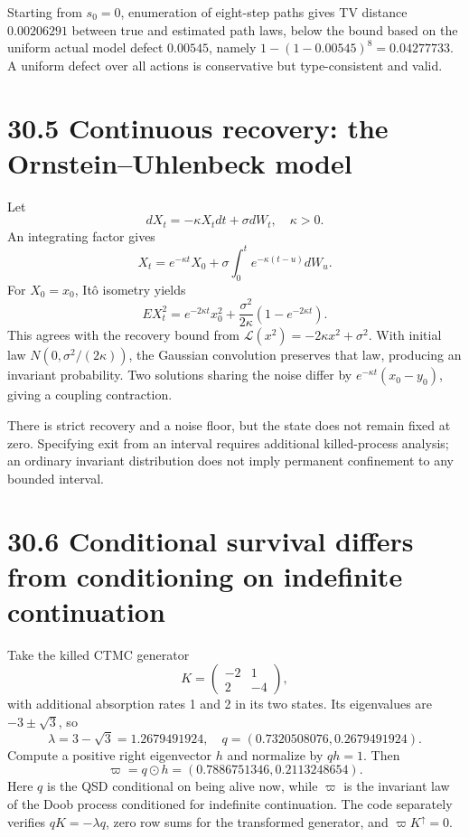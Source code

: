 \documentclass[
  english,
  11pt,
  oneside]{book}
\begin{document}
Starting from \(s_0=0\), enumeration of eight-step paths gives TV distance \(0.00206291\) between true and estimated path laws, below the bound based on the uniform actual model defect \(0.00545\), namely \(1-(1-0.00545)^8=0.04277733\). A uniform defect over all actions is conservative but type-consistent and valid.

\section{30.5 Continuous recovery: the Ornstein--Uhlenbeck model}\label{continuous-recovery-the-ornsteinuhlenbeck-model}

Let \[dX_t=-\kappa X_tdt+\sigma dW_t,\quad\kappa>0.\] An integrating factor gives \[X_t=e^{-\kappa t}X_0+
\sigma\int_0^te^{-\kappa(t-u)}dW_u.\] For \(X_0=x_0\), Itô isometry yields \[EX_t^2=e^{-2\kappa t}x_0^2+
\frac{\sigma^2}{2\kappa}(1-e^{-2\kappa t}).\] This agrees with the recovery bound from \(\mathcal L(x^2)=-2\kappa x^2+\sigma^2\). With initial law \(N(0,\sigma^2/(2\kappa))\), the Gaussian convolution preserves that law, producing an invariant probability. Two solutions sharing the noise differ by \(e^{-\kappa t}(x_0-y_0)\), giving a coupling contraction.

There is strict recovery and a noise floor, but the state does not remain fixed at zero. Specifying exit from an interval requires additional killed-process analysis; an ordinary invariant distribution does not imply permanent confinement to any bounded interval.

\section{30.6 Conditional survival differs from conditioning on indefinite continuation}\label{conditional-survival-differs-from-conditioning-on-indefinite-continuation}

Take the killed CTMC generator \[K=\begin{pmatrix}-2&1\\2&-4\end{pmatrix},\] with additional absorption rates 1 and 2 in its two states. Its eigenvalues are \(-3\pm\sqrt3\), so \[\lambda=3-\sqrt3=1.2679491924,
\quad q=(0.7320508076,0.2679491924).\] Compute a positive right eigenvector \(h\) and normalize by \(qh=1\). Then \[\varpi=q\odot h=(0.7886751346,0.2113248654).\] Here \(q\) is the QSD conditional on being alive now, while \(\varpi\) is the invariant law of the Doob process conditioned for indefinite continuation. The code separately verifies \(qK=-\lambda q\), zero row sums for the transformed generator, and \(\varpi K^\uparrow=0\).
\end{document}
